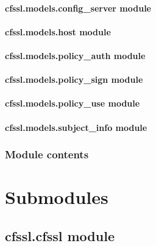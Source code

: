 \documentclass[letterpaper,10pt,english]{sphinxmanual}
\begin{document}
\paragraph{cfssl.models.config\_server module}
\label{cfssl.models.config_server::doc}\label{cfssl.models.config_server:cfssl-models-config-server-module}

\paragraph{cfssl.models.host module}
\label{cfssl.models.host::doc}\label{cfssl.models.host:cfssl-models-host-module}

\paragraph{cfssl.models.policy\_auth module}
\label{cfssl.models.policy_auth:cfssl-models-policy-auth-module}\label{cfssl.models.policy_auth::doc}

\paragraph{cfssl.models.policy\_sign module}
\label{cfssl.models.policy_sign::doc}\label{cfssl.models.policy_sign:cfssl-models-policy-sign-module}

\paragraph{cfssl.models.policy\_use module}
\label{cfssl.models.policy_use:cfssl-models-policy-use-module}\label{cfssl.models.policy_use::doc}

\paragraph{cfssl.models.subject\_info module}
\label{cfssl.models.subject_info:cfssl-models-subject-info-module}\label{cfssl.models.subject_info::doc}

\subsubsection{Module contents}
\label{cfssl.models:module-contents}

\section{Submodules}
\label{cfssl:submodules}

\subsection{cfssl.cfssl module}
\label{cfssl.cfssl:cfssl-cfssl-module}\label{cfssl.cfssl::doc}
\end{document}

